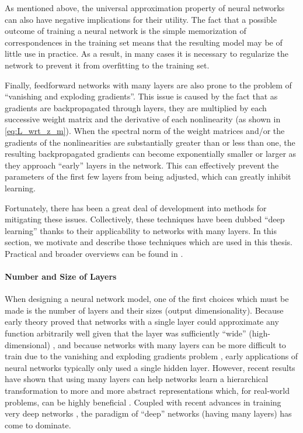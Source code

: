 As mentioned above, the universal approximation property of neural networks can also have negative implications for their utility.
The fact that a possible outcome of training a neural network is the simple memorization of correspondences in the training set means that the resulting model may be of little use in practice.
As a result, in many cases it is necessary to regularize the network to prevent it from overfitting to the training set.

Finally, feedforward networks with many layers are also prone to the problem of ``vanishing and exploding gradients''.
This issue is caused by the fact that as gradients are backpropagated through layers, they are multiplied by each successive weight matrix and the derivative of each nonlinearity (as shown in \cref{eq:L_wrt_z_m}).
When the spectral norm of the weight matrices and/or the gradients of the nonlinearities are substantially greater than or less than one, the resulting backpropagated gradients can become exponentially smaller or larger as they approach ``early'' layers in the network.
This can effectively prevent the parameters of the first few layers from being adjusted, which can greatly inhibit learning.

Fortunately, there has been a great deal of development into methods for mitigating these issues.
Collectively, these techniques have been dubbed ``deep learning'' thanks to their applicability to networks with many layers.
In this section, we motivate and describe those techniques which are used in this thesis.
Practical and broader overviews can be found in \cite{bengio} \cite{lecun} \cite{nature}.

\paragraph{Number and Size of Layers}

When designing a neural network model, one of the first choices which must be made is the number of layers and their sizes (output dimensionality).
Because early theory proved that networks with a single layer could approximate any function arbitrarily well given that the layer was sufficiently ``wide'' (high-dimensional) \cite{}, and because networks with many layers can be more difficult to train due to the vanishing and exploding gradients problem \cite{}, early applications of neural networks typically only used a single hidden layer.
However, recent results have shown that using many layers can help networks learn a hierarchical transformation to more and more abstract representations which, for real-world problems, can be highly beneficial \cite{}.
Coupled with recent advances in training very deep networks \cite{}, the paradigm of ``deep'' networks (having many layers) has come to dominate.

